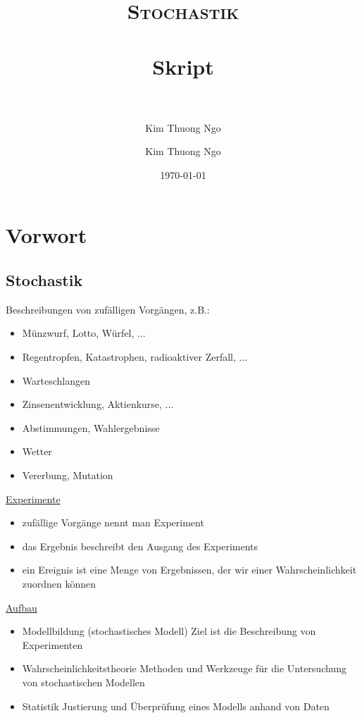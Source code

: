 \documentclass[paper=a4, fontsize=11pt]{scrartcl}
\author{Kim Thuong Ngo}
\title{	
\normalfont \normalsize 
\textsc{Stochastik} \\ [25pt] 
\horrule{0.5pt} \\[0.4cm] 
\huge Skript \\ 
\horrule{2pt} \\[0.5cm] 
}
\author{Kim Thuong Ngo}
\date{\normalsize\today}
\numberwithin{equation}{section}
\numberwithin{figure}{section}
\numberwithin{table}{section}
\begin{document}
\maketitle 

\newpage

\tableofcontents

\newpage

\section{Vorwort}
\subsection{Stochastik}

Beschreibungen von zufälligen Vorgängen, z.B.:

\begin{itemize}
\item Münzwurf, Lotto, Würfel, ...
\item Regentropfen, Katastrophen, radioaktiver Zerfall, ...
\item Warteschlangen
\item Zinsenentwicklung, Aktienkurse, ...
\item Abstimmungen, Wahlergebnisse
\item Wetter
\item Vererbung, Mutation
\end{itemize}

\underline{Experimente}

\begin{itemize}
\item zufällige Vorgänge nennt man Experiment
\item das Ergebnis beschreibt den Ausgang des Experiments
\item ein Ereignis ist eine Menge von Ergebnissen, der wir einer Wahrscheinlichkeit zuordnen können
\end{itemize}

\underline{Aufbau}

\begin{itemize}
\item Modellbildung (stochastisches Modell)
Ziel ist die Beschreibung von Experimenten
\item Wahrscheinlichkeitstheorie
Methoden und Werkzeuge für die Untersuchung von stochastischen Modellen
\item Statistik
Justierung und Überprüfung eines Modells anhand von Daten
\end{itemize}
\end{document}
